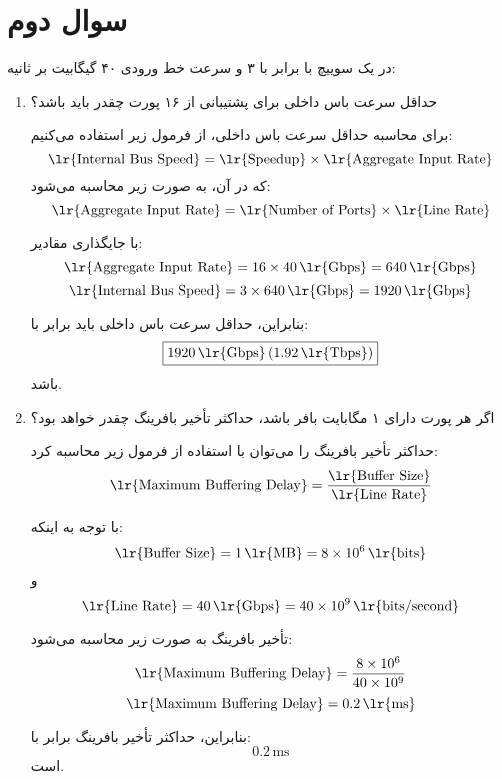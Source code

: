 \section{سوال دوم}

در یک سوییچ با  برابر با ۳ و سرعت خط ورودی ۴۰ گیگابیت بر ثانیه:

\begin{enumerate}
	\item 
	حداقل سرعت باس داخلی برای پشتیبانی از ۱۶ پورت چقدر باید باشد؟
	
	\begin{qsolve}
			
			برای محاسبه حداقل سرعت باس داخلی، از فرمول زیر استفاده می‌کنیم:
			\[
			\text{\lr{Internal Bus Speed}} = \text{\lr{Speedup}} \times \text{\lr{Aggregate Input Rate}}
			\]
			که در آن،  به صورت زیر محاسبه می‌شود:
			\[
			\text{\lr{Aggregate Input Rate}} = \text{\lr{Number of Ports}} \times \text{\lr{Line Rate}}
			\]
			
			با جایگذاری مقادیر:
			\[
			\text{\lr{Aggregate Input Rate}} = 16 \times 40 \, \text{\lr{Gbps}} = 640 \, \text{\lr{Gbps}}
			\]
			\[
			\text{\lr{Internal Bus Speed}} = 3 \times 640 \, \text{\lr{Gbps}} = 1920 \, \text{\lr{Gbps}}
			\]
			
			بنابراین، حداقل سرعت باس داخلی باید برابر با:
			\[
			\boxed{1920 \, \text{\lr{Gbps}} \, (1.92 \, \text{\lr{Tbps}})}
			\]
			باشد.
	\end{qsolve}
	
	
	\item 
	اگر هر پورت دارای ۱ مگابایت بافر باشد، حداکثر تأخیر بافرینگ چقدر خواهد بود؟
	\begin{qsolve}
		حداکثر تأخیر بافرینگ را می‌توان با استفاده از فرمول زیر محاسبه کرد:
		\[
		\text{\lr{Maximum Buffering Delay}} = \frac{\text{\lr{Buffer Size}}}{\text{\lr{Line Rate}}}
		\]
		
		با توجه به اینکه:
		\[
		\text{\lr{Buffer Size}} = 1 \, \text{\lr{MB}} = 8 \times 10^6 \, \text{\lr{bits}}
		\]
		و
		\[
		\text{\lr{Line Rate}} = 40 \, \text{\lr{Gbps}} = 40 \times 10^9 \, \text{\lr{bits/second}}
		\]
		
		تأخیر بافرینگ به صورت زیر محاسبه می‌شود:
		\[
		\text{\lr{Maximum Buffering Delay}} = \frac{8 \times 10^6}{40 \times 10^9}
		\]
		\[
		\text{\lr{Maximum Buffering Delay}} = 0.2 \, \text{\lr{ms}}
		\]
		
		بنابراین، حداکثر تأخیر بافرینگ برابر با:
		\[
		\boxed{0.2 \, \text{ms}}
		\]
		است.
	\end{qsolve}
\end{enumerate}

